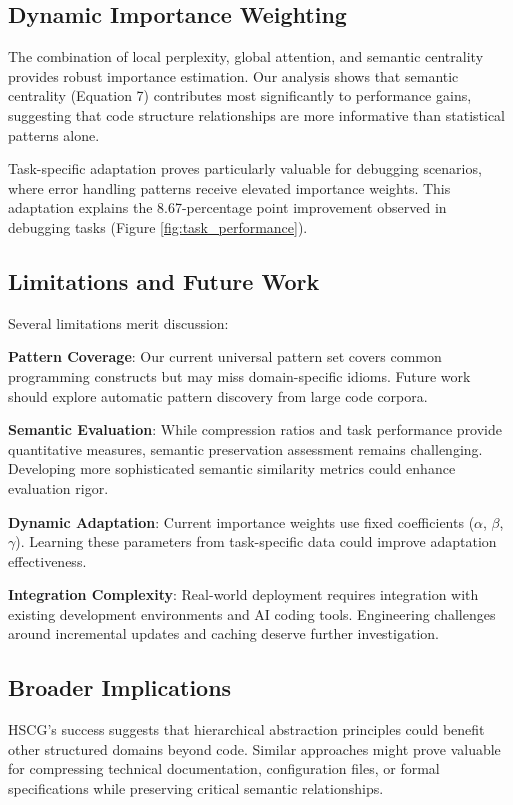 \documentclass[conference]{IEEEtran}
\begin{document}
\subsection{Dynamic Importance Weighting}

The combination of local perplexity, global attention, and semantic centrality provides robust importance estimation. Our analysis shows that semantic centrality (Equation 7) contributes most significantly to performance gains, suggesting that code structure relationships are more informative than statistical patterns alone.

Task-specific adaptation proves particularly valuable for debugging scenarios, where error handling patterns receive elevated importance weights. This adaptation explains the 8.67-percentage point improvement observed in debugging tasks (Figure \ref{fig:task_performance}).

\subsection{Limitations and Future Work}

Several limitations merit discussion:

\textbf{Pattern Coverage}: Our current universal pattern set covers common programming constructs but may miss domain-specific idioms. Future work should explore automatic pattern discovery from large code corpora.

\textbf{Semantic Evaluation}: While compression ratios and task performance provide quantitative measures, semantic preservation assessment remains challenging. Developing more sophisticated semantic similarity metrics could enhance evaluation rigor.

\textbf{Dynamic Adaptation}: Current importance weights use fixed coefficients ($\alpha$, $\beta$, $\gamma$). Learning these parameters from task-specific data could improve adaptation effectiveness.

\textbf{Integration Complexity}: Real-world deployment requires integration with existing development environments and AI coding tools. Engineering challenges around incremental updates and caching deserve further investigation.

\subsection{Broader Implications}

HSCG's success suggests that hierarchical abstraction principles could benefit other structured domains beyond code. Similar approaches might prove valuable for compressing technical documentation, configuration files, or formal specifications while preserving critical semantic relationships.
\end{document}
